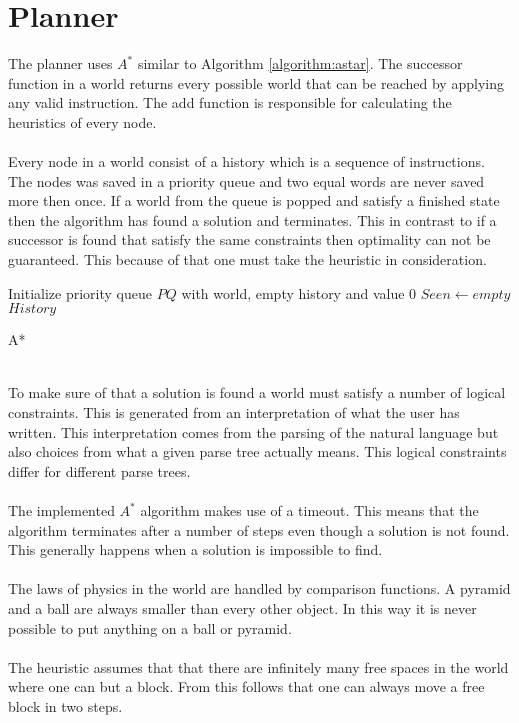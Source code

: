 \section{Planner}
The planner uses $A^*$ similar to Algorithm \ref{algorithm:astar}. The
successor function in a world returns every possible world that can be reached
by applying any valid instruction. The add function is responsible for
calculating the heuristics of every node.
\\\\
Every node in a world consist of a history which is a sequence of instructions. 
The nodes was saved in a priority queue and two equal words are never saved more
then once. If a world from the queue is popped and satisfy a finished state
then the algorithm has found a solution and terminates. This in contrast to if a
successor is found that satisfy the same constraints then optimality can not be
guaranteed. This because of that one must take the heuristic in consideration. \\ 
\begin{algorithm}[h!]
 \SetAlgoLined
 Initialize priority queue $PQ$ with world, empty history and value 0\;
 $Seen \leftarrow empty$\;
 \Return $History$
 \caption{A*}
 \label{algorithm:astar}
\end{algorithm} 
\\
To make sure of that a solution is found a world must satisfy a number of logical
constraints. This is generated from an interpretation of what the user has
written. This interpretation comes from the parsing of the natural language but 
also choices from what a given parse tree actually means. This logical
constraints differ for different parse trees.   
\\\\
The implemented $A^*$ algorithm makes use of a timeout. This means that 
the algorithm terminates after a number of steps even though a solution is not
found. This generally happens when a solution is impossible to find. 
\\\\
The laws of physics in the world are handled by comparison functions. A pyramid
and a ball are always smaller than every other object. In this way it is never
possible to put anything on a ball or pyramid. 
\\\\
The heuristic assumes that that there are infinitely many free spaces in the
world where one can but a block. From this follows that one can always move a
free block in two steps. 


